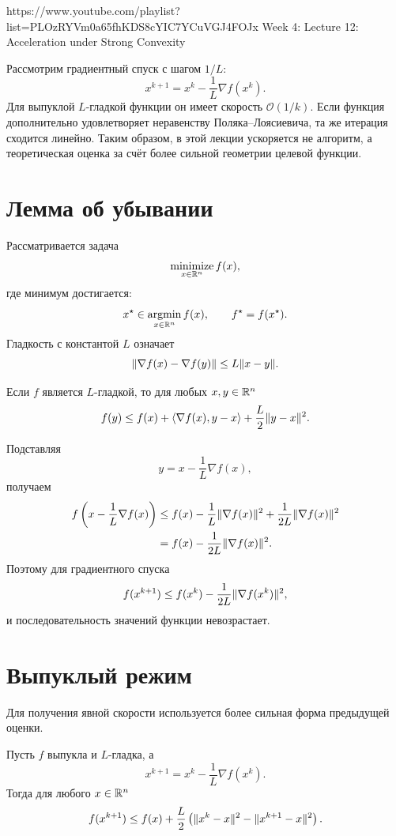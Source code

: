 
\sourcevideo
    {https://www.youtube.com/playlist?list=PLOzRYVm0a65fhKDS8cYIC7YCuVGJ4FOJx}
    {Week 4: Lecture 12: Acceleration under Strong Convexity}

Рассмотрим градиентный спуск с шагом \(1/L\):
\[
    x^{k+1}=x^k-\frac1L\nabla f(x^k).
\]
Для выпуклой \(L\)-гладкой функции он имеет скорость
\(\mathcal O(1/k)\). Если функция дополнительно удовлетворяет
неравенству Поляка--Лоясиевича, та же итерация сходится линейно.
Таким образом, в этой лекции ускоряется не алгоритм, а теоретическая
оценка за счёт более сильной геометрии целевой функции.

\section{Лемма об убывании}

Рассматривается задача
\[
    \operatorname*{minimize}_{x\in\mathbb{R}^n} f(x),
\]
где минимум достигается:
\[
    x^\star\in\operatorname*{argmin}_{x\in\mathbb{R}^n}f(x),
    \qquad
    f^\star=f(x^\star).
\]
Гладкость с константой \(L\) означает
\[
    \lVert\nabla f(x)-\nabla f(y)\rVert
    \le
    L\lVert x-y\rVert.
\]

\begin{lemma}
Если \(f\) является \(L\)-гладкой, то для любых \(x,y\in\mathbb{R}^n\)
\[
    f(y)
    \le
    f(x)
    +
    \left\langle \nabla f(x),y-x \right\rangle
    +
    \frac L2\lVert y-x\rVert^2.
\]
\end{lemma}

Подставляя
\[
    y=x-\frac1L\nabla f(x),
\]
получаем
\[
\begin{aligned}
    f\left(x-\frac1L\nabla f(x)\right)
    &\le
    f(x)
    -\frac1L\lVert\nabla f(x)\rVert^2
    +\frac1{2L}\lVert\nabla f(x)\rVert^2
    \\
    &=
    f(x)-\frac1{2L}\lVert\nabla f(x)\rVert^2.
\end{aligned}
\]
Поэтому для градиентного спуска
\[
    f(x^{k+1})
    \le
    f(x^k)
    -
    \frac1{2L}\lVert\nabla f(x^k)\rVert^2,
\]
и последовательность значений функции невозрастает.

\section{Выпуклый режим}

Для получения явной скорости используется более сильная форма
предыдущей оценки.

\begin{lemma}
Пусть \(f\) выпукла и \(L\)-гладка, а
\[
    x^{k+1}=x^k-\frac1L\nabla f(x^k).
\]
Тогда для любого \(x\in\mathbb{R}^n\)
\[
\begin{aligned}
    f(x^{k+1})
    \le
    f(x)
    +
    \frac L2
    \left(
        \lVert x^k-x\rVert^2
        -
        \lVert x^{k+1}-x\rVert^2
    \right).
\end{aligned}
\]
\end{lemma}

